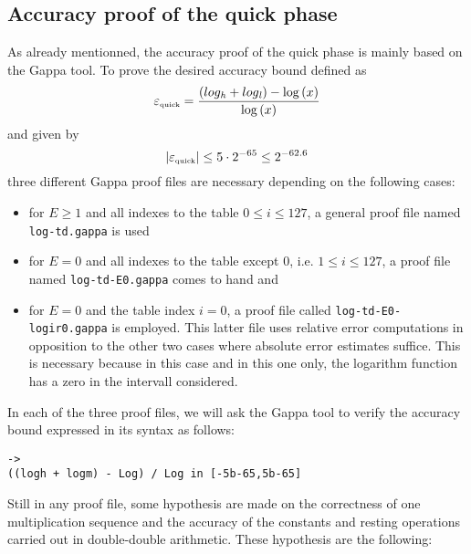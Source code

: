 \subsection{Accuracy proof of the quick phase\label{subsec:quickphase}}
As already mentionned, the accuracy proof of the quick phase is mainly based on the Gappa tool. To prove the desired
accuracy bound defined as
$$\epsilon_{\mbox{\tiny quick}} = \frac{\left(log_\hi + log_\lo\right) - \log\left(x\right)}{\log\left(x\right)}$$ 
and given by
$$\left \vert \epsilon_{\mbox{\tiny quick}} \right \vert \leq 5 \cdot 2^{-65} \leq 2^{-62.6}$$ 
three different Gappa proof files are necessary depending on the following cases: 
\begin{itemize}
\item for $E \geq 1$ and all indexes to the table $0 \leq i \leq 127$, a general proof file named {\tt log-td.gappa} is used
\item for $E = 0$ and all indexes to the table except $0$, i.e. $1 \leq i \leq 127$, a proof file named {\tt log-td-E0.gappa}
comes to hand and
\item for $E = 0$ and the table index $i = 0$, a proof file called {\tt log-td-E0-logir0.gappa} is employed. 
This latter file
uses relative error computations in opposition to the other two cases where absolute error estimates suffice. This
is necessary because in this case and in this one only, the logarithm function has a zero in the intervall considered.
\end{itemize}
In each of the three proof files, we will ask the Gappa tool to verify the accuracy bound expressed in its syntax as
follows:
\begin{lstlisting}[caption={Accuracy bound to prove},firstnumber=109]
->
((logh + logm) - Log) / Log in [-5b-65,5b-65]
\end{lstlisting}
Still in any proof file, some hypothesis are made on the correctness of one multiplication sequence and the
accuracy of the constants and resting operations carried out in double-double arithmetic.
These hypothesis are the following:

